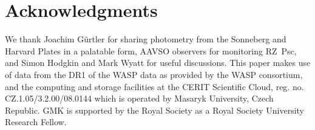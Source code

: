 \documentclass[useAMS,usenatbib,usegraphicx]{mn2e}
\begin{document}
\section*{Acknowledgments}

We thank Joachim G\"urtler for sharing photometry from the Sonneberg and Harvard Plates
in a palatable form, AAVSO observers for monitoring RZ~Psc, and Simon Hodgkin and Mark
Wyatt for useful discussions. This paper makes use of data from the DR1 of the WASP data
\citep{2010A&A...520L..10B} as provided by the WASP consortium, and the computing and
storage facilities at the CERIT Scientific Cloud, reg. no. CZ.1.05/3.2.00/08.0144 which
is operated by Masaryk University, Czech Republic. GMK is supported by the Royal Society
as a Royal Society University Research Fellow.

 

%
\end{document}
